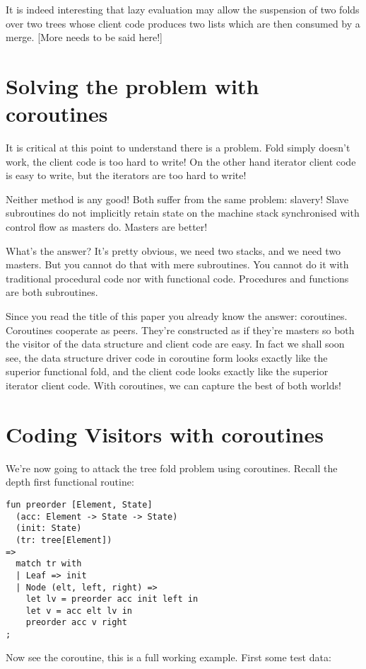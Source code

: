 \documentclass[oneside]{book}
\begin{document}
It is indeed interesting that lazy evaluation may allow the suspension
of two folds over two trees whose client code produces two lists which
are then consumed by a merge. [More needs to be said here!]

\section{Solving the problem with coroutines}
It is critical at this point to understand there is a problem.
Fold simply doesn't work, the client code is too hard to write!
On the other hand iterator client code is easy to write, but
the iterators are too hard to write!

Neither method is any good! Both suffer from the same problem:
slavery! Slave subroutines do not implicitly retain state on the
machine stack synchronised with control flow as masters do.
Masters are better! 

What's the answer? It's pretty obvious, we need two stacks, and we
need two masters. But you cannot do that with mere subroutines.
You cannot do it with traditional procedural code nor with
functional code. Procedures and functions are both subroutines.

Since you read the title of this paper you already know the answer:
coroutines. Coroutines cooperate as peers. They're constructed as if they're
masters so both the visitor of the data structure and client code are
easy. In fact we shall soon see, the data structure driver code in
coroutine form looks exactly like the superior functional fold,
and the client code looks exactly like the superior iterator client code.
With coroutines, we can capture the best of both worlds!

\section{Coding Visitors with coroutines}
We're now going to attack the tree fold problem using coroutines.
Recall the depth first functional routine:

\begin{verbatim}
fun preorder [Element, State]
  (acc: Element -> State -> State)
  (init: State)
  (tr: tree[Element])
=>
  match tr with
  | Leaf => init
  | Node (elt, left, right) =>
    let lv = preorder acc init left in
    let v = acc elt lv in
    preorder acc v right
;
\end{verbatim}

Now see the coroutine, this is a full working example.
First some test data:
\end{document}
